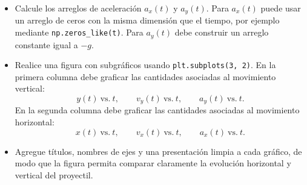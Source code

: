 \begin{tcolorbox}[colback=blue!2!white,colframe=blue!55!black,title={Enunciado},breakable]
\begin{itemize}
    \item[(e)] Calcule los arreglos de aceleración $a_x(t)$ y $a_y(t)$. Para $a_x(t)$ puede usar un arreglo de ceros con la misma dimensión que el tiempo, por ejemplo mediante \texttt{np.zeros\_like(t)}. Para $a_y(t)$ debe construir un arreglo constante igual a $-g$.

    \item[(f)] Realice una figura con subgráficos usando \texttt{plt.subplots(3, 2)}. En la primera columna debe graficar las cantidades asociadas al movimiento vertical:
    \[
    y(t) \ \text{vs.} \ t,
    \qquad
    v_y(t) \ \text{vs.} \ t,
    \qquad
    a_y(t) \ \text{vs.} \ t.
    \]
    En la segunda columna debe graficar las cantidades asociadas al movimiento horizontal:
    \[
    x(t) \ \text{vs.} \ t,
    \qquad
    v_x(t) \ \text{vs.} \ t,
    \qquad
    a_x(t) \ \text{vs.} \ t.
    \]

    \item[(g)] Agregue títulos, nombres de ejes y una presentación limpia a cada gráfico, de modo que la figura permita comparar claramente la evolución horizontal y vertical del proyectil.
\end{itemize}
\end{tcolorbox}


